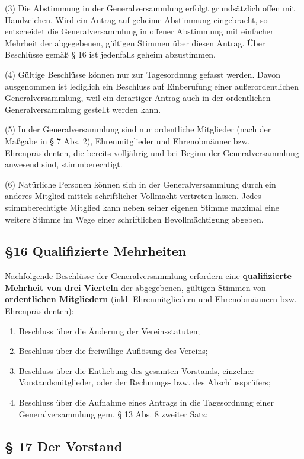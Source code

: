 \documentclass[11pt,a4paper]{article}
\begin{document}
(3)
Die Abstimmung in der Generalversammlung erfolgt grundsätzlich offen mit Handzeichen.
Wird ein Antrag auf geheime Abstimmung eingebracht, so entscheidet die Generalversammlung in offener Abstimmung mit einfacher Mehrheit der abgegebenen, gültigen Stimmen über diesen Antrag.
Über Beschlüsse gemäß § 16 ist jedenfalls geheim abzustimmen.

(4)
Gültige Beschlüsse können nur zur Tagesordnung gefasst werden.
Davon ausgenommen ist lediglich ein Beschluss auf Einberufung einer außerordentlichen Generalversammlung, weil ein derartiger Antrag auch in der ordentlichen Generalversammlung gestellt werden kann.

(5)
In der Generalversammlung sind nur ordentliche Mitglieder (nach der Maßgabe in § 7 Abs. 2), Ehrenmitglieder und Ehrenobmänner bzw. Ehrenpräsidenten, die bereits volljährig und bei Beginn der Generalversammlung anwesend sind, stimmberechtigt.

(6)
Natürliche Personen können sich in der Generalversammlung durch ein anderes Mitglied mittels schriftlicher Vollmacht vertreten lassen.
Jedes stimmberechtigte Mitglied kann neben seiner eigenen Stimme maximal eine weitere Stimme im Wege einer schriftlichen Bevollmächtigung abgeben.

\subsection{§16 Qualifizierte Mehrheiten}

Nachfolgende Beschlüsse der Generalversammlung erfordern eine \textbf{qualifizierte Mehrheit von drei Vierteln} der abgegebenen, gültigen Stimmen von \textbf{ordentlichen Mitgliedern} (inkl. Ehrenmitgliedern und Ehrenobmännern bzw. Ehrenpräsidenten):

\begin{enumerate}[label=\alph*)]
\item
Beschluss über die Änderung der Vereinsstatuten;
\item
Beschluss über die freiwillige Auflösung des Vereins;
\item
Beschluss über die Enthebung des gesamten Vorstands, einzelner Vorstandsmitglieder, oder der Rechnungs- bzw. des Abschlussprüfers;
\item
Beschluss über die Aufnahme eines Antrags in die Tagesordnung einer Generalversammlung gem. § 13 Abs. 8 zweiter Satz;
\end{enumerate}

\subsection{§ 17
Der Vorstand}
\end{document}

